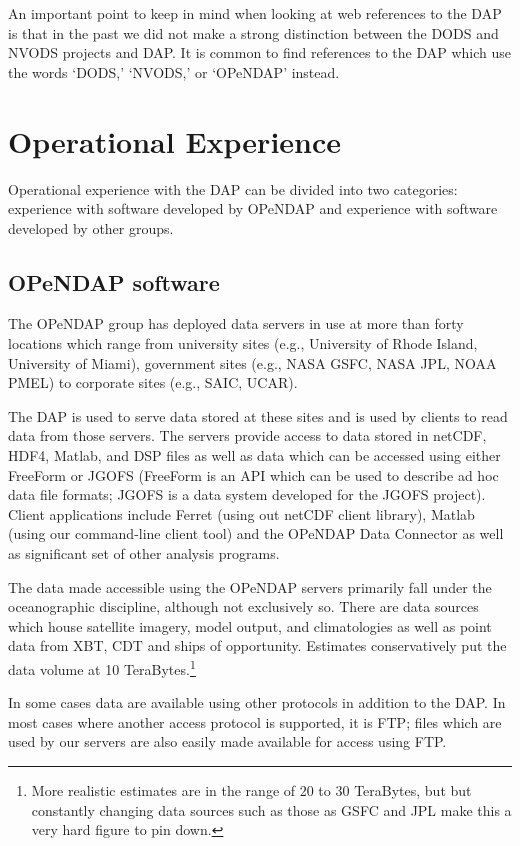 \documentclass[justify]{dods-paper}
\begin{document}
An important point to keep in mind when looking at web references to the DAP
is that in the past we did not make a strong distinction between the DODS and
NVODS projects and DAP. It is common to find references to the DAP which use
the words `DODS,' `NVODS,' or `OPeNDAP' instead.

\section{Operational Experience}

Operational experience with the DAP can be divided into two categories:
experience with software developed by OPeNDAP and experience with software
developed by other groups.

\subsection{OPeNDAP software}
\label{opendap-servers}

The OPeNDAP group has deployed data servers in use at more than forty
locations which range from university sites (e.g., University of Rhode
Island, University of Miami), government sites (e.g., NASA GSFC, NASA JPL,
NOAA PMEL) to corporate sites (e.g., SAIC, UCAR).

The DAP is used to serve data stored at these sites and is used by clients to
read data from those servers. The servers provide access to data stored in
netCDF, HDF4, Matlab, and DSP files as well as data which can be accessed
using either FreeForm or JGOFS (FreeForm is an API which can be used to
describe ad hoc data file formats; JGOFS is a data system developed for the
JGOFS project). Client applications include Ferret (using out netCDF client
library), Matlab (using our command-line client tool) and the OPeNDAP Data
Connector as well as significant set of other analysis programs. 

The data made accessible using the OPeNDAP servers primarily fall under the
oceanographic discipline, although not exclusively so. There are data sources
which house satellite imagery, model output, and climatologies as well as
point data from XBT, CDT and ships of opportunity. Estimates conservatively
put the data volume at 10 TeraBytes.\footnote{More realistic estimates are
in the range of 20 to 30 TeraBytes, but but constantly changing data sources
such as those as GSFC and JPL make this a very hard figure to pin down.}

In some cases data are available using other protocols in addition to the
DAP. In most cases where another access protocol is supported, it is FTP;
files which are used by our servers are also easily made available for access
using FTP.
\end{document}
